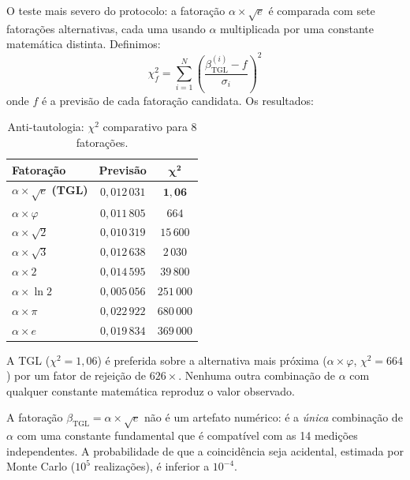 \documentclass[12pt,a4paper,twoside]{article}
\newcommand{\betatgl}{\beta_{\!\scriptscriptstyle\mathrm{TGL}}}
\begin{document}
O teste mais severo do protocolo: a fatoração $\alpha \times \sqrt{e}$ é comparada com sete fatorações alternativas, cada uma usando $\alpha$ multiplicada por uma constante matemática distinta. Definimos:
%
\begin{equation}
\chi^2_f = \sum_{i=1}^{N} \left(\frac{\betatgl^{(i)} - f}{\sigma_i}\right)^{\!2}
\end{equation}
%
onde $f$ é a previsão de cada fatoração candidata. Os resultados:

\begin{table}[H]
\centering
\caption{Anti-tautologia: $\chi^2$ comparativo para 8 fatorações.}
\label{tab:anti_tautologia}
\begin{tabular}{lcc}
\toprule
\textbf{Fatoração} & \textbf{Previsão} & $\boldsymbol{\chi^2}$ \\
\midrule
$\alpha \times \sqrt{e}$ \textbf{(TGL)} & $0{,}012\,031$ & $\boldsymbol{1{,}06}$ \\
\midrule
$\alpha \times \varphi$ & $0{,}011\,805$ & $664$ \\
$\alpha \times \sqrt{2}$ & $0{,}010\,319$ & $15\,600$ \\
$\alpha \times \sqrt{3}$ & $0{,}012\,638$ & $2\,030$ \\
$\alpha \times 2$ & $0{,}014\,595$ & $39\,800$ \\
$\alpha \times \ln 2$ & $0{,}005\,056$ & $251\,000$ \\
$\alpha \times \pi$ & $0{,}022\,922$ & $680\,000$ \\
$\alpha \times e$ & $0{,}019\,834$ & $369\,000$ \\
\bottomrule
\end{tabular}
\end{table}

\noindent A TGL ($\chi^2 = 1{,}06$) é preferida sobre a alternativa mais próxima ($\alpha \times \varphi$, $\chi^2 = 664$) por um fator de rejeição de $626\times$. Nenhuma outra combinação de $\alpha$ com qualquer constante matemática reproduz o valor observado.

\begin{resultbox}[title={Anti-tautologia}]
A fatoração $\betatgl = \alpha \times \sqrt{e}$ não é um artefato numérico: é a \textit{única} combinação de $\alpha$ com uma constante fundamental que é compatível com as 14 medições independentes. A probabilidade de que a coincidência seja acidental, estimada por Monte Carlo ($10^5$ realizações), é inferior a $10^{-4}$.
\end{resultbox}
\end{document}
